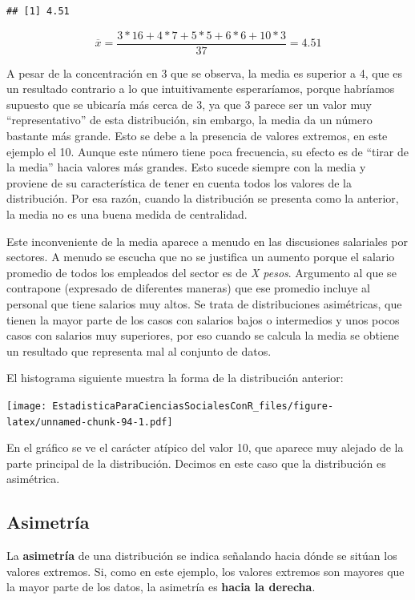 \documentclass[]{book}
\begin{document}
\begin{verbatim}
## [1] 4.51
\end{verbatim}

\[\overline{x} = \frac{3*16 + 4*7 + 5*5 + 6*6 + 10*3}{37} = 4.51\]

A pesar de la concentración en 3 que se observa, la media es superior a 4, que es un resultado contrario a lo que intuitivamente esperaríamos,
porque habríamos supuesto que se ubicaría más cerca de 3, ya que 3
parece ser un valor muy ``representativo'' de esta distribución, sin
embargo, la media da un número bastante más grande. Esto se debe a la
presencia de valores extremos, en este ejemplo el 10. Aunque este número
tiene poca frecuencia, su efecto es de ``tirar de la media'' hacia valores
más grandes. Esto sucede siempre con la media y proviene de su
característica de tener en cuenta todos los valores de la distribución.
Por esa razón, cuando la distribución se presenta como la anterior, la
media no es una buena medida de centralidad.

Este inconveniente de la media aparece a menudo en las discusiones
salariales por sectores. A menudo se escucha que no se justifica un
aumento porque el salario promedio de todos los empleados del sector es
de \emph{X pesos}. Argumento al que se contrapone (expresado de diferentes
maneras) que ese promedio incluye al personal que tiene salarios muy
altos. Se trata de distribuciones asimétricas, que tienen la mayor parte
de los casos con salarios bajos o intermedios y unos pocos casos con
salarios muy superiores, por eso cuando se calcula la media se obtiene
un resultado que representa mal al conjunto de datos.

El histograma siguiente muestra la forma de la distribución anterior:

\texttt{[image: EstadisticaParaCienciasSocialesConR\_files/figure-latex/unnamed-chunk-94-1.pdf]}

En el gráfico se ve el carácter atípico del valor 10, que aparece muy
alejado de la parte principal de la distribución. Decimos en este caso
que la distribución es asimétrica.

\hypertarget{asimetruxeda}{%
\subsection{Asimetría}\label{asimetruxeda}}

La \textbf{asimetría} de una distribución se indica señalando hacia dónde se
sitúan los valores extremos. Si, como en este ejemplo, los valores
extremos son mayores que la mayor parte de los datos, la asimetría es
\textbf{hacia la derecha}.
\end{document}
